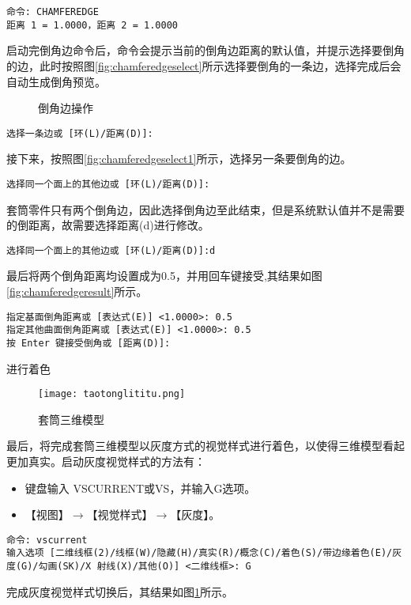 \begin{procedure}
\begin{lstlisting}
命令: CHAMFEREDGE
距离 1 = 1.0000，距离 2 = 1.0000
\end{lstlisting}
启动完倒角边命令后，命令会提示当前的倒角边距离的默认值，并提示选择要倒角的边，此时按照图\ref{fig:chamferedgeselect}所示选择要倒角的一条边，选择完成后会自动生成倒角预览。
\begin{figure}[htbp]
\centering
{}\hspace{20pt}
\hspace{20pt}
\caption{倒角边操作}
\end{figure}
\begin{lstlisting}
选择一条边或 [环(L)/距离(D)]:
\end{lstlisting}
接下来，按照图\ref{fig:chamferedgeselect1}所示，选择另一条要倒角的边。
\begin{lstlisting}
选择同一个面上的其他边或 [环(L)/距离(D)]:
\end{lstlisting}
套筒零件只有两个倒角边，因此选择倒角边至此结束，但是系统默认值并不是需要的倒距离，故需要选择距离(d)进行修改。
\begin{lstlisting}
选择同一个面上的其他边或 [环(L)/距离(D)]:d
\end{lstlisting}
最后将两个倒角距离均设置成为0.5，并用回车键接受,其结果如图\ref{fig:chamferedgeresult}所示。
\begin{lstlisting}
指定基面倒角距离或 [表达式(E)] <1.0000>: 0.5
指定其他曲面倒角距离或 [表达式(E)] <1.0000>: 0.5
按 Enter 键接受倒角或 [距离(D)]:
\end{lstlisting}
\item 进行着色
\begin{figure}[htbp]
\centering
\texttt{[image: taotonglititu.png]}
\caption{套筒三维模型}\label{fig:taotonglititu}
\end{figure}
最后，将完成套筒三维模型以灰度方式的视觉样式进行着色，以使得三维模型看起更加真实。启动灰度视觉样式的方法有：
\begin{itemize}
\item 键盘输入 VSCURRENT或VS，并输入G选项。
\item 【视图】$\rightarrow$【视觉样式】$\rightarrow$【灰度】。
\end{itemize}
\begin{lstlisting}
命令: vscurrent
输入选项 [二维线框(2)/线框(W)/隐藏(H)/真实(R)/概念(C)/着色(S)/带边缘着色(E)/灰度(G)/勾画(SK)/X 射线(X)/其他(O)] <二维线框>: G
\end{lstlisting}
完成灰度视觉样式切换后，其结果如图\ref{fig:taotonglititu}所示。

\end{procedure}

\endinput